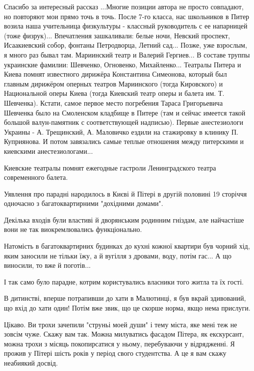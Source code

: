 \begin{itemize}
Спасибо за интересный рассказ ...Многие позиции автора не просто совпадают, но
повторяют мои прямо точь в точь. После 7-го класса, нас школьников в Питер
возила наша учительница физкультуры - классный руководитель с ее напарницей
(тоже физрук)... Впечатления зашкаливали: белые ночи, Невский проспект,
Исаакиевский собор, фонтаны Петродворца, Летний сад... Позже, уже взрослым, я
много раз бывал там. Мариинский театр и Валерий Гергиев... В составе труппы
украинские фамилии: Шевченко, Огновенко, Михайленко... Театралы Питера и Киева
помнят известного дирижёра Константина Симеонова, который был главным дирижёром
оперных театров Мариинского (тогда Кировского) и Национальной оперы Киева
(тогда Киевский театр оперы и балета им. Т. Шевченка). Кстати, самое первое
место погребения Тараса Григорьевича Шевченка было на Смоленском кладбище в
Питере (там и сейчас имеется такой большой валун-памятник с соответствующей
надписью). Первые анестезиологи Украины - А. Трещинский, А. Маловичко ездили на
стажировку в клинику П. Куприянова. И потом завязались самые теплые отношения
между питерскими и киевскими анестезиологами...

\begin{itemize} %
Киевские театралы помнят ежегодные гастроли Ленинградского театра современного балета.
\end{itemize} %


Уявлення про парадні народилось в Києві й Пітері в другій половині 19 сторіччя
одночасно з багатоквартирними "дохідними домами".

Декілька входів були властиві й дворянським родинним гніздам, але найчастіше
вони не так виокремлювались функціонально.

Натомість в багатоквартирних будинках до кухні кожної квартири був чорний хід,
яким заносили не тільки їжу, а й вугілля з дровами, воду, потім гас... А що
виносили, то вже й поготів...

І так само було парадне, котрим користувались власники того житла та їх гості.

В дитинстві, вперше потрапивши до хати в Малютинці, я був вкрай здивований, що
вхід до хати один! Потім вже звик, що це скорше норма, якщо нема прислуги.


Цікаво. Ви трохи зачепили "струньі моей души" і тему міста, яке мені теж не
зовсім чуже. Скажу вам так. Можна милуватись фасадом Пітера, як екскурсант,
можна трохи з місяць покопирсатися у ньому, перебуваючи у відрядженні. Я прожив
у Пітері шість років у період свого студентства. А це я вам скажу неабиякий
досвід. 


\end{itemize}
